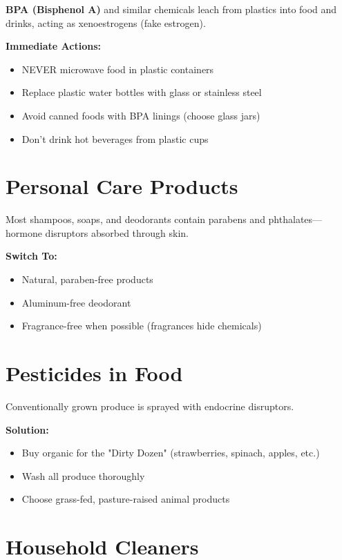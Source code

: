\documentclass[11pt,oneside,openany]{book}
\begin{document}
\textbf{BPA (Bisphenol A)} and similar chemicals leach from plastics into food and drinks, acting as xenoestrogens (fake estrogen).

\textbf{Immediate Actions:}
\begin{itemize}[leftmargin=*]
\item NEVER microwave food in plastic containers
\item Replace plastic water bottles with glass or stainless steel
\item Avoid canned foods with BPA linings (choose glass jars)
\item Don't drink hot beverages from plastic cups
\end{itemize}

\section*{Personal Care Products}

Most shampoos, soaps, and deodorants contain parabens and phthalates---hormone disruptors absorbed through skin.

\textbf{Switch To:}
\begin{itemize}[leftmargin=*]
\item Natural, paraben-free products
\item Aluminum-free deodorant
\item Fragrance-free when possible (fragrances hide chemicals)
\end{itemize}

\section*{Pesticides in Food}

Conventionally grown produce is sprayed with endocrine disruptors.

\textbf{Solution:}
\begin{itemize}[leftmargin=*]
\item Buy organic for the "Dirty Dozen" (strawberries, spinach, apples, etc.)
\item Wash all produce thoroughly
\item Choose grass-fed, pasture-raised animal products
\end{itemize}

\section*{Household Cleaners}
\end{document}
